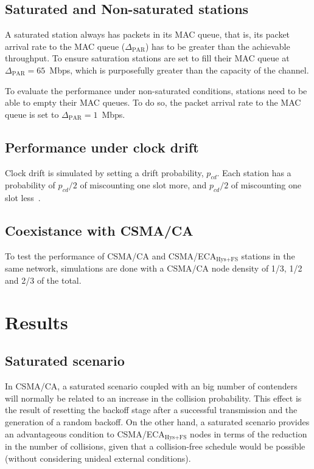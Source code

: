 \documentclass[a4paper,journal]{IEEEtran}
\begin{document}
	\subsection{Saturated and Non-saturated stations}\label{unsaturation}
	A saturated station always has packets in its MAC queue, that is, its packet arrival rate to the MAC queue ($\Delta_{\text{PAR}}$) has to be greater than the achievable throughput. To ensure saturation stations are set to fill their MAC queue at $\Delta_{\text{PAR}}=65$~Mbps, which is purposefully greater than the capacity of the channel.
	
	To evaluate the performance under non-saturated conditions, stations need to be able to empty their MAC queues. To do so, the packet arrival rate to the MAC queue is set to $\Delta_{\text{PAR}}=1$~Mbps.
	
	\subsection{Performance under clock drift}
	Clock drift is simulated by setting a drift probability, $p_{cd}$. Each station has a probability of $p_{cd}/2$ of miscounting one slot more, and $p_{cd}/2$ of miscounting one slot less~\cite{slotDrift}.
	
	\subsection{Coexistance with CSMA/CA}
	To test the performance of CSMA/CA and CSMA/ECA$_{\text{Hys+FS}}$ stations in the same network, simulations are done with a CSMA/CA node density of 1/3, 1/2 and 2/3 of the total.
	

\section{Results}\label{results}

	\subsection{Saturated scenario}\label{resultsSaturated}
	In CSMA/CA, a saturated scenario coupled with an big number of contenders will normally be related to an increase in the collision probability. This effect is the result of resetting the backoff stage after a successful transmission and the generation of a random backoff. On the other hand, a saturated scenario provides an advantageous condition to CSMA/ECA$_{\text{Hys+FS}}$ nodes in terms of the reduction in the number of collisions, given that a collision-free schedule would be possible (without considering unideal external conditions).
	
\end{document}
